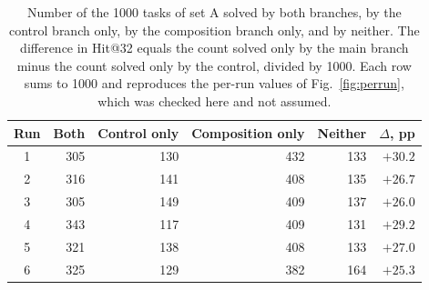 \begin{table}[!tbh]
\centering\footnotesize\setlength{\tabcolsep}{5pt}
\begin{tabular}{|c|r|r|r|r|r|}
\hline
\textbf{Run} & \textbf{Both} & \textbf{Control only} & \textbf{Composition only} & \textbf{Neither} & \textbf{$\Delta$, pp} \\
\hline
1 & 305 & 130 & 432 & 133 & $+30.2$ \\ \hline
2 & 316 & 141 & 408 & 135 & $+26.7$ \\ \hline
3 & 305 & 149 & 409 & 137 & $+26.0$ \\ \hline
4 & 343 & 117 & 409 & 131 & $+29.2$ \\ \hline
5 & 321 & 138 & 408 & 133 & $+27.0$ \\ \hline
6 & 325 & 129 & 382 & 164 & $+25.3$ \\ \hline
\end{tabular}
\caption{Number of the 1000 tasks of set A solved by both branches, by the control
branch only, by the composition branch only, and by neither. The difference in
Hit@32 equals the count solved only by the main branch minus the count solved only
by the control, divided by 1000. Each row sums to 1000 and reproduces the per-run
values of Fig.~\ref{fig:perrun}, which was checked here and not assumed.}
\label{tab:paired}
\end{table}
